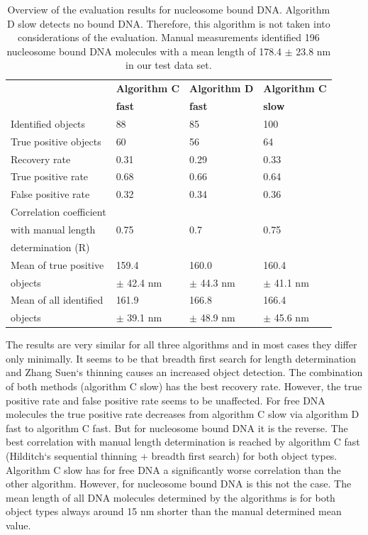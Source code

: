 \documentclass{article}
\begin{document}
\begin{table}[!htbp]
	\centering
	\caption{Overview of the evaluation results for nucleosome bound DNA. Algorithm D slow detects no bound DNA. Therefore, this algorithm is not taken into considerations of the evaluation. Manual measurements identified 196 nucleosome bound DNA molecules with a mean length of 178.4 $\pm$ 23.8 nm in our test data set.}
	\begin{tabular*}{\textwidth}{llll} \hline
		\textbf{} & \textbf{Algorithm C} & \textbf{Algorithm D} & \textbf{Algorithm C} \\ 
		\textbf{} & \textbf{fast} & \textbf{fast} & \textbf{slow} \\ \hline
		Identified objects & 88    & 85    & 100 \\
		True positive objects & 60    & 56    & 64 \\
		Recovery rate & 0.31  & 0.29  & 0.33 \\
		True positive rate & 0.68  & 0.66  & 0.64 \\
		False positive rate & 0.32  & 0.34  & 0.36 \\
		Correlation coefficient & & & \\
		with manual length & 0.75  & 0.7   & 0.75  \\
		determination (R) & & & \\
		Mean of true positive & 159.4  & 160.0  & 160.4  \\
		objects & $\pm$ 42.4 nm & $\pm$ 44.3 nm & $\pm$ 41.1 nm \\
		Mean of all identified & 161.9  & 166.8  & 166.4  \\ 
		objects & $\pm$ 39.1 nm & $\pm$ 48.9 nm & $\pm$ 45.6 nm \\ \hline
	\end{tabular*}%
	\label{tab:validation_table4}%
\end{table}%

The results are very similar for all three algorithms and in most cases they differ only minimally. It seems to be that breadth first search for length determination and Zhang Suen‘s thinning causes an increased object detection. The combination of both methods (algorithm C slow) has the best recovery rate. However, the true positive rate and false positive rate seems to be unaffected. For free DNA molecules the true positive rate decreases from algorithm C slow via algorithm D fast to algorithm C fast. But for nucleosome bound DNA it is the reverse. The best correlation with manual length determination is reached by algorithm C fast (Hilditch‘s sequential thinning + breadth first search) for both object types. Algorithm C slow has for free DNA a significantly worse correlation than the other algorithm. However, for nucleosome bound DNA is this not the case. The mean length of all DNA molecules determined by the algorithms is for both object types always around 15 nm shorter than the manual determined mean value.
\end{document}
